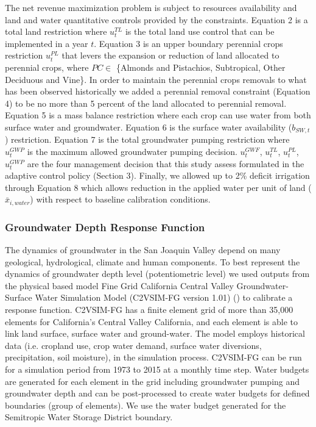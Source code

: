 \documentclass[11pt,a4paper]{article}
\begin{document}
The net revenue maximization problem is subject to resources availability and land and water quantitative controls provided by the constraints. Equation 2 is a total land restriction where $u^{TL}_{t}$ is the total land use control that can be implemented in a year $t$. Equation 3 is an upper boundary perennial crops restriction $u^{PL}_{t}$ that levers the expansion or reduction of land allocated to perennial crops, where $PC \in$ \{Almonds and Pistachios, Subtropical, Other Deciduous and Vine\}. In order to maintain the perennial crops removals to what has been observed historically we added a perennial removal constraint (Equation 4) to be no more than 5 percent of the land allocated to perennial removal. Equation 5 is a mass balance restriction where each crop can use water from both surface water and groundwater. Equation 6 is the surface water availability ($b_{SW,t}$) restriction. Equation 7 is the total groundwater pumping restriction where $u^{GWP}_{t}$ is the maximum allowed groundwater pumping decision. $u^{GWF}_{t}$, $u^{TL}_{t}$, $u^{PL}_{t}$, $u^{GWP}_{t}$ are the four management decision that this study assess formulated in the adaptive control policy (Section  3).  Finally, we allowed up to 2\% deficit irrigation through Equation 8 which allows reduction in the applied water per  unit of land ($\bar{x}_{i,water}$) with respect to baseline calibration conditions. 

\subsubsection{Groundwater Depth Response Function}

The dynamics of groundwater in the San Joaquin Valley depend on many geological, hydrological, climate and human components. To best represent the dynamics of groundwater depth level (potentiometric level) we used outputs from the physical based model Fine Grid California Central Valley Groundwater-Surface Water Simulation Model (C2VSIM-FG version 1.01) (\cite{dwr_c2vsimfg_2021}) to calibrate a response function. C2VSIM-FG has a finite element grid of more than 35,000 elements for California’s Central Valley California, and each element is able to link land surface, surface water and ground-water. The model employs historical data (i.e. cropland use, crop water demand, surface water diversions, precipitation, soil moisture), in the simulation process. C2VSIM-FG can be run for a simulation period from 1973 to 2015 at a monthly time step. Water budgets are generated for each element in the grid including groundwater pumping and groundwater depth and can be post-processed to create water budgets for defined boundaries (group of elements). We use the water budget generated for the Semitropic Water Storage District boundary. 
\end{document}
